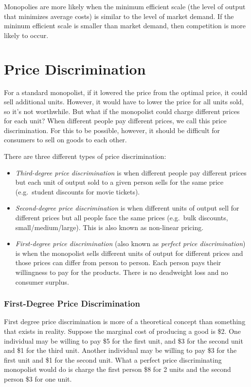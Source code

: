 \documentclass{article}
\begin{document}
\bigskip
Monopolies are more likely when the minimum efficient scale (the level of output that minimizes average costs) is similar to the level of market demand. If the mininum efficient scale is smaller than market demand, then competition is more likely to occur.
\section{Price Discrimination}
For a standard monopolist, if it lowered the price from the optimal price, it could sell additional units. However, it would have to lower the price for all units sold, so it's not worthwhile. But what if the monopolist could charge different prices for each unit? When different people pay different prices, we call this price discrimination. For this to be possible, however, it should be difficult for consumers to sell on goods to each other.

There are three different types of price discrimination:
\begin{itemize}
  \item \emph{Third-degree price discrimination} is when different people pay different prices but each unit of output sold to a given person sells for the same price (e.g.~student discounts for movie tickets).
  \item \emph{Second-degree price discrimination} is when different units of output sell for different prices but all people face the same prices (e.g.~bulk discounts, small/medium/large). This is also known as non-linear pricing.
  \item \emph{First-degree price discrimination} (also known as \emph{perfect price discrimination}) is when the monopolist sells different units of output for different prices and those prices can differ from person to person. Each person pays their willingness to pay for the products. There is no deadweight loss and no consumer surplus.
\end{itemize}

\subsubsection*{First-Degree Price Discrimination}
First degree price discrimination is more of a theoretical concept than something that exists in reality. Suppose the marginal cost of producing a good is \$2. One individual may be willing to pay \$5 for the first unit, and \$3 for the second unit and \$1 for the third unit. Another individual may be willing to pay \$3 for the first unit and \$1 for the second unit. What a perfect price discriminating monopolist would do is charge the first person \$8 for 2 units and the second person \$3 for one unit.
\end{document}
